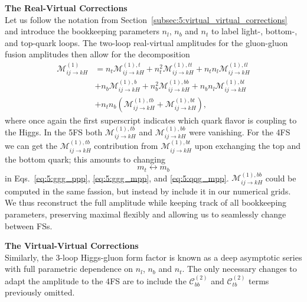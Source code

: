 \textbf{The Real-Virtual Corrections} \\
Let us follow the notation from Section~\ref{subsec:5:virtual_virtual_corrections} and introduce the bookkeeping parameters $n_l$, $n_b$ and $n_t$ to label light-, bottom-, and top-quark loops. The two-loop real-virtual amplitudes for the gluon-gluon fusion amplitudes then allow for the decomposition
\begin{equation}
\begin{split}
\mathcal{M}_{ij \rightarrow k H}^{(1)} &= n_t \mathcal{M}_{ij \rightarrow kH}^{(1),t} +  n_t^2 \mathcal{M}_{ij \rightarrow kH}^{(1),tt} +  n_t n_l \mathcal{M}_{ij \rightarrow kH}^{(1),tl} \\
& +  n_b \mathcal{M}_{ij \rightarrow kH}^{(1),b} +  n_b^2 \mathcal{M}_{ij \rightarrow kH}^{(1),bb} +  n_b n_l \mathcal{M}_{ij \rightarrow kH}^{(1),bl} \\
& + n_t n_b \left( \mathcal{M}_{ij \rightarrow k H}^{(1), tb} + \mathcal{M}_{ij \rightarrow k H}^{(1), bt} \right),
\end{split}
\label{eq:5:real_virtual_decomposition}
\end{equation}
where once again the first superscript indicates which quark flavor is coupling to the Higgs. In the 5\acs{FS} both $\mathcal{M}_{ij \rightarrow k H}^{(1), tb}$ and $\mathcal{M}_{ij \rightarrow k H}^{(1), bb}$ were vanishing. For the 4\acs{FS} we can get the $\mathcal{M}_{ij \rightarrow k H}^{(1), tb}$ contribution from $\mathcal{M}_{ij \rightarrow k H}^{(1), bt}$ upon exchanging the top and the bottom quark; this amounts to changing
\begin{equation}
m_t \longleftrightarrow m_b
\end{equation}
in Eqs.~\eqref{eq:5:ggg_ppp}, \eqref{eq:5:ggg_mpp}, and \eqref{eq:5:qqg_mpp}. $\mathcal{M}_{ij \rightarrow k H}^{(1), bb}$ could be computed in the same fassion, but instead by include it in our numerical grids. We thus reconstruct the full amplitude while keeping track of all bookkeeping parameters, preserving maximal flexibly and allowing us to seamlessly change between \acs{FS}s.

\textbf{The Virtual-Virtual Corrections} \\
Similarly, the 3-loop Higgs-gluon form factor is known as a deep asymptotic series with full parametric dependence on $n_l$, $n_b$ and $n_t$. The only necessary changes to adapt the amplitude to the 4\acs{FS} are to include the $\mathcal{C}^{(2)}_{bb}$ and $\mathcal{C}^{(2)}_{tb}$ terms previously omitted.



